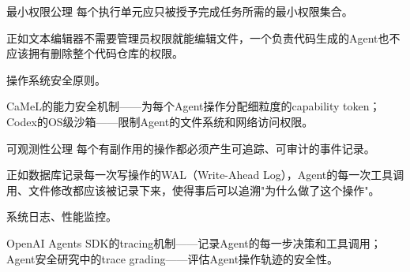 \begin{axiombox}{\theaxiom\enspace 最小权限公理}
每个执行单元应只被授予完成任务所需的最小权限集合。
\end{axiombox}
\begin{description}[style=nextline,leftmargin=2em,font=\bfseries]
\item[直观解释] 正如文本编辑器不需要管理员权限就能编辑文件，一个负责代码生成的Agent也不应该拥有删除整个代码仓库的权限。
\item[经典来源] 操作系统安全原则\cite{ostep_2023}。
\item[ICA体现] CaMeL的能力安全机制\cite{debenedetti2025camel}——为每个Agent操作分配细粒度的capability token；Codex的OS级沙箱\cite{openai_codex_security_2026}——限制Agent的文件系统和网络访问权限。
\end{description}

\begin{axiombox}{\theaxiom\enspace 可观测性公理}
每个有副作用的操作都必须产生可追踪、可审计的事件记录。
\end{axiombox}
\begin{description}[style=nextline,leftmargin=2em,font=\bfseries]
\item[直观解释] 正如数据库记录每一次写操作的WAL（Write-Ahead Log），Agent的每一次工具调用、文件修改都应该被记录下来，使得事后可以追溯"为什么做了这个操作"。
\item[经典来源] 系统日志、性能监控\cite{linux_cgroup_2026}。
\item[ICA体现] OpenAI Agents SDK的tracing机制\cite{openai_codex_agentsdk_2026}——记录Agent的每一步决策和工具调用；Agent安全研究中的trace grading\cite{agenticsecurity2025}——评估Agent操作轨迹的安全性。
\end{description}

